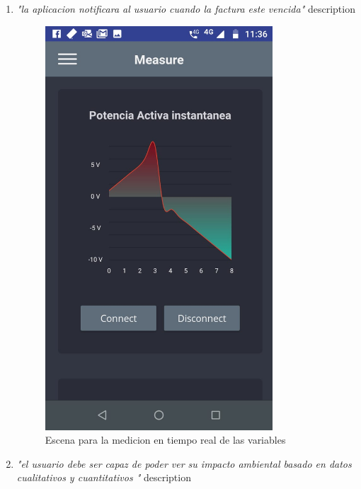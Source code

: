 \begin{enumerate}
	
	\item  \textsl{"la aplicacion notificara al usuario cuando la factura este vencida"} description
	 \begin{figure}[htbp]
	 	\centerline{\includegraphics[width=8.5cm]{./figuras/mobile_measure.jpeg}}
	 	\caption{Escena para la medicion en tiempo real de las variables}
	 	\label{fig_15}
	 \end{figure}
	 
	 
	
	 
	\item \textsl{"el usuario debe ser capaz de poder ver su impacto ambiental basado en datos cualitativos y cuantitativos "} description
	

\end{enumerate}

